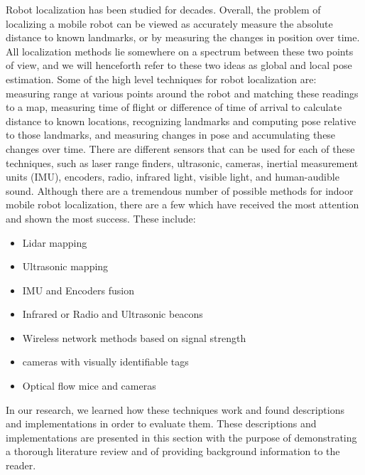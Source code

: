 \documentclass{article}
\begin{document}
  Robot localization has been studied for decades. Overall, the problem of localizing a mobile robot can be viewed as accurately measure the absolute distance to known landmarks, or by measuring the changes in position over time. All localization methods lie somewhere on a spectrum between these two points of view, and we will henceforth refer to these two ideas as global and local pose estimation. Some of the high level techniques for robot localization are: measuring range at various points around the robot and matching these readings to a map, measuring time of flight or difference of time of arrival to calculate distance to known locations, recognizing landmarks and computing pose relative to those landmarks, and measuring changes in pose and accumulating these changes over time. There are different sensors that can be used for each of these techniques, such as laser range finders, ultrasonic, cameras, inertial measurement units (IMU), encoders, radio, infrared light, visible light, and human-audible sound. Although there are a tremendous number of possible methods for indoor mobile robot localization, there are a few which have received the most attention and shown the most success. These include:
  \begin{itemize}
      \item Lidar mapping
      \item Ultrasonic mapping
      \item IMU and Encoders fusion
      \item Infrared or Radio and Ultrasonic beacons
      \item Wireless network methods based on signal strength
      \item cameras with visually identifiable tags
      \item Optical flow mice and cameras
  \end{itemize}

  In our research, we learned how these techniques work and found descriptions and implementations in order to evaluate them. These descriptions and implementations are presented in this section with the purpose of demonstrating a thorough literature review and of providing background information to the reader.
\end{document}

